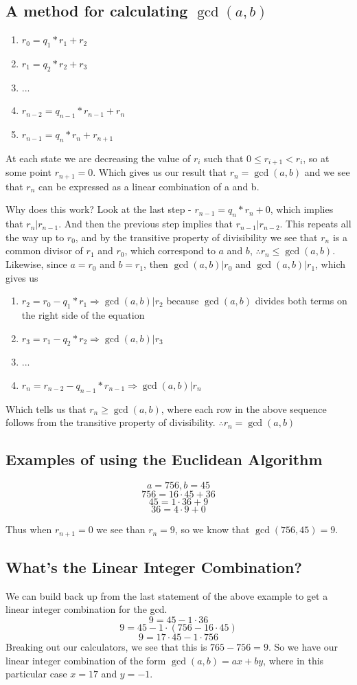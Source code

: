 \documentclass[10pt]{article}
\theoremstyle{definition}
\theoremstyle{remark}
\def\ra{\Rightarrow}
\begin{document}
\subsection*{A method for calculating $\gcd(a,b)$}
\begin{enumerate}
\item $r_{0} = q_1 * r_1 + r_{2}$
\item $r_{1} = q_2 * r_2 + r_{3}$
\item ...
\item $r_{n-2} = q_{n-1} * r_{n-1} + r_n$
\item $r_{n-1} = q_n * r_n + r_{n+1}$
\end{enumerate}
At each state we are decreasing the value of $r_i$ such that $0\leq r_{i+1} < r_i$, so at some point $r_{n+1}=0$.  Which gives us our result that $r_n = \gcd(a,b)$ and we see that $r_n$ can be expressed as a linear combination of a and b.

Why does this work?  Look at the last step - $r_{n-1} = q_n * r_n + 0$, which implies that $r_n|r_{n-1}$.  And then the previous step implies that $r_{n-1}|r_{n-2}$.  This repeats all the way up to $r_0$, and by the transitive property of divisibility we see that $r_n$ is a common divisor of $r_1$ and $r_0$, which correspond to $a$ and $b$, $\therefore r_n \leq \gcd(a,b)$.
Likewise, since $a = r_0$ and $b = r_1$, then $\gcd(a,b)|r_0$ and $\gcd(a,b)|r_1$, which gives us\\
\begin{enumerate}
\item $r_{2} = r_{0} - q_1 * r_1 \ra \gcd(a,b)|r_2$ because $\gcd(a,b)$ divides both terms on the right side of the equation 
\item $r_{3} = r_{1} - q_2 * r_2 \ra \gcd(a,b)|r_3$
\item ...
\item $r_{n} = r_{n-2} - q_{n-1} * r_{n-1} \ra \gcd(a,b)|r_n$
\end{enumerate}
Which tells us that $r_n\geq\gcd(a,b)$, where each row in the above sequence follows from the transitive property of divisibility.  $\therefore r_n = \gcd(a,b)$
\subsection{Examples of using the Euclidean Algorithm}
$$a = 756, b = 45$$
$$756 = 16\cdot 45 + 36$$
$$45 = 1\cdot 36 + 9$$
$$36 = 4\cdot 9 + 0$$

Thus when $r_{n+1} = 0$ we see than $r_n = 9$, so we know that $\gcd(756,45)=9$.
\subsection{What's the Linear Integer Combination?}
We can build back up from the last statement of the above example to get a linear integer combination for the gcd.
$$9 = 45 - 1\cdot 36$$
$$9 = 45 - 1\cdot(756-16\cdot 45)$$
$$9 = 17\cdot 45 - 1\cdot 756$$
Breaking out our calculators, we see that this is $765-756 = 9$.  So we have our linear integer combination of the form $\gcd(a,b) = ax + by$, where in this particular case $x=17$ and $y=-1$.
\end{document}
